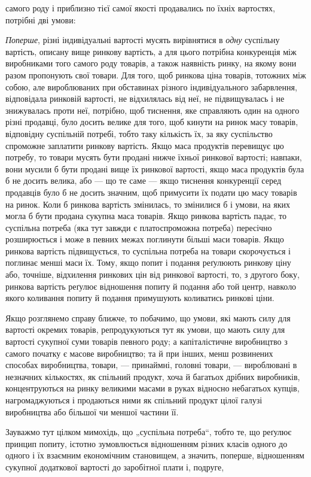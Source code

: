 \parcont{}  %
самого роду і приблизно тієї самої якості продавались по їхніх
вартостях, потрібні дві умови:

\emph{Поперше}, різні індивідуальні вартості мусять вирівнятися
в \emph{одну} суспільну вартість, описану вище ринкову вартість, а для
цього потрібна конкуренція між виробниками того самого роду
товарів, а також наявність ринку, на якому вони разом пропонують свої товари. Для того, щоб ринкова
ціна товарів, тотожних між собою, але вироблюваних при обставинах різного
індивідуального забарвлення, відповідала ринковій вартості, не
відхилялась від неї, не підвищувалась і не знижувалась проти
неї, потрібно, щоб тиснення, яке справляють один на одного
різні продавці, було досить велике для того, щоб кинути на
ринок масу товарів, відповідну суспільній потребі, тобто таку
кількість їх, за яку суспільство спроможне заплатити ринкову
вартість. Якщо маса продуктів перевищує цю потребу, то товари мусять бути продані нижче їхньої
ринкової вартості; навпаки,
вони мусили б бути продані вище їх ринкової вартості, якщо
маса продуктів була б не досить велика, або — що те саме — якщо тиснення конкуренції серед продавців
було б не досить
значним, щоб примусити їх подати цю масу товарів на ринок.
Коли б ринкова вартість змінилась, то змінилися б і умови,
на яких могла б бути продана сукупна маса товарів. Якщо ринкова вартість падає, то суспільна потреба
(яка тут завжди
є платоспроможна потреба) пересічно розширюється і може
в певних межах поглинути більші маси товарів. Якщо ринкова
вартість підвищується, то суспільна потреба на товари скорочується і поглинає менші маси їх. Тому,
якщо попит і подання
реґулюють ринкову ціну або, точніше, відхилення ринкових цін
від ринкової вартості, то, з другого боку, ринкова вартість реґулює відношення попиту й подання або
той центр, навколо
якого коливання попиту й подання примушують коливатись
ринкові ціни.

Якщо розглянемо справу ближче, то побачимо, що умови,
які мають силу для вартості окремих товарів, репродукуються
тут як умови, що мають силу для вартості сукупної суми товарів певного роду; а капіталістичне
виробництво з самого
початку є масове виробництво; та й при інших, менш розвинених способах виробництва, товари, —
принаймні, головні товари, — вироблювані в незначних кількостях, як спільний продукт, хоча й
багатьох дрібних виробників, концентруються на ринку великими масами в руках відносно небагатьох
купців,
нагромаджуються і продаються ними як спільний продукт цілої
галузі виробництва або більшої чи меншої частини її.

Зауважмо тут цілком мимохідь, що „суспільна потреба“,
тобто те, що реґулює принцип попиту, істотно зумовлюється
відношенням різних класів одного до одного і їх взаємним
економічним становищем, а значить, поперше, відношенням сукупної додаткової вартості до заробітної
плати і, подруге,
\parbreak{}  %
